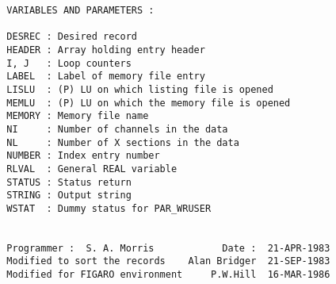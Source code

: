 \begin{description}
\begin{verbatim}
  VARIABLES AND PARAMETERS :

  DESREC : Desired record
  HEADER : Array holding entry header
  I, J   : Loop counters
  LABEL  : Label of memory file entry
  LISLU  : (P) LU on which listing file is opened
  MEMLU  : (P) LU on which the memory file is opened
  MEMORY : Memory file name
  NI     : Number of channels in the data
  NL     : Number of X sections in the data
  NUMBER : Index entry number
  RLVAL  : General REAL variable
  STATUS : Status return
  STRING : Output string
  WSTAT  : Dummy status for PAR_WRUSER


  Programmer :  S. A. Morris            Date :  21-APR-1983
  Modified to sort the records    Alan Bridger  21-SEP-1983
  Modified for FIGARO environment     P.W.Hill  16-MAR-1986
\end{verbatim}
\end{description}
